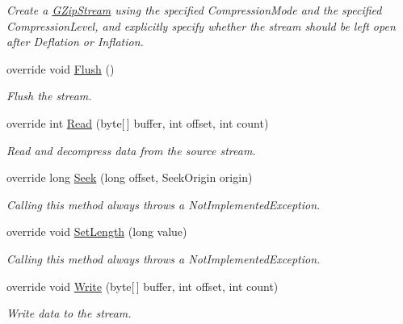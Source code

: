 \begin{DoxyCompactItemize}
\begin{DoxyCompactList}\small\item\em Create a {\ttfamily \mbox{\hyperlink{class_super_tiled2_unity_1_1_ionic_1_1_zlib_1_1_g_zip_stream}{G\+Zip\+Stream}}} using the specified {\ttfamily Compression\+Mode} and the specified {\ttfamily Compression\+Level}, and explicitly specify whether the stream should be left open after Deflation or Inflation. \end{DoxyCompactList}\item 
override void \mbox{\hyperlink{class_super_tiled2_unity_1_1_ionic_1_1_zlib_1_1_g_zip_stream_ad71244e7b3bcea606d73cbf964f9f239}{Flush}} ()
\begin{DoxyCompactList}\small\item\em Flush the stream. \end{DoxyCompactList}\item 
override int \mbox{\hyperlink{class_super_tiled2_unity_1_1_ionic_1_1_zlib_1_1_g_zip_stream_a772b5013a585850ffaf8be4aa7f3dbcf}{Read}} (byte\mbox{[}$\,$\mbox{]} buffer, int offset, int count)
\begin{DoxyCompactList}\small\item\em Read and decompress data from the source stream. \end{DoxyCompactList}\item 
override long \mbox{\hyperlink{class_super_tiled2_unity_1_1_ionic_1_1_zlib_1_1_g_zip_stream_a098a173894636f7470f79af72c12ba4f}{Seek}} (long offset, Seek\+Origin origin)
\begin{DoxyCompactList}\small\item\em Calling this method always throws a Not\+Implemented\+Exception. \end{DoxyCompactList}\item 
override void \mbox{\hyperlink{class_super_tiled2_unity_1_1_ionic_1_1_zlib_1_1_g_zip_stream_a79496db830d2a246f7c5aac8f3305617}{Set\+Length}} (long value)
\begin{DoxyCompactList}\small\item\em Calling this method always throws a Not\+Implemented\+Exception. \end{DoxyCompactList}\item 
override void \mbox{\hyperlink{class_super_tiled2_unity_1_1_ionic_1_1_zlib_1_1_g_zip_stream_a49032afb5806563236a5d53841abe2b8}{Write}} (byte\mbox{[}$\,$\mbox{]} buffer, int offset, int count)
\begin{DoxyCompactList}\small\item\em Write data to the stream. \end{DoxyCompactList}\end{DoxyCompactItemize}
